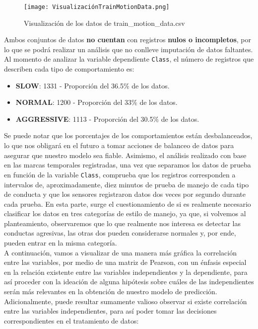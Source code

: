 \documentclass[spanish,12pt,letterpaper]{article}
\begin{document}
    \begin{figure}[H]
        \centering
        \texttt{[image: VisualizaciónTrainMotionData.png]}
        \caption{Visualización de los datos de train\_motion\_data.csv}
        \label{fig:comand}%
    \end{figure}

\textsc Ambos conjuntos de datos \textbf{no cuentan} con registros \textbf{nulos o incompletos}, por lo que se podrá realizar un análisis que no conlleve imputación de datos faltantes. Al momento de analizar la variable dependiente \verb|Class|, el número de registros que describen cada tipo de comportamiento es:

\begin{itemize}
    \item \textbf{SLOW}: 1331 - Proporción del 36.5\% de los datos.
    \item \textbf{NORMAL}: 1200 - Proporción del 33\% de los datos.
    \item \textbf{AGGRESSIVE}: 1113 - Proporción del 30.5\% de los datos.
\end{itemize}

Se puede notar que los porcentajes de los comportamientos están desbalanceados, lo que nos obligará en el futuro a tomar acciones de balanceo de datos para asegurar que nuestro modelo sea fiable. Asimismo, el análisis realizado con base en las marcas temporales registradas, una vez que separamos los datos de prueba en función de la variable \verb|Class|, comprueba que los registros corresponden a intervalos de, aproximadamente, diez minutos de prueba de manejo de cada tipo de conducta y que los sensores registraron datos dos veces por segundo durante cada prueba. En esta parte, surge el cuestionamiento de si es realmente necesario clasificar los datos en tres categorías de estilo de manejo, ya que, si volvemos al planteamiento, observaremos que lo que realmente nos interesa es detectar las conductas agresivas, las otras dos pueden considerarse normales y, por ende, pueden entrar en la misma categoría.\\

\textsc A continuación, vamos a visualizar de una manera más gráfica la correlación entre las variables, por medio de una matriz de Pearson, con un énfasis especial en la relación existente entre las variables independientes y la dependiente, para así proceder con la ideación de alguna hipótesis sobre cuáles de las independientes serán más relevantes en la obtención de nuestro modelo de predicción. Adicionalmente, puede resultar sumamente valioso observar si existe correlación entre las variables independientes, para así poder tomar las decisiones correspondientes en el tratamiento de datos:\\
\end{document}
